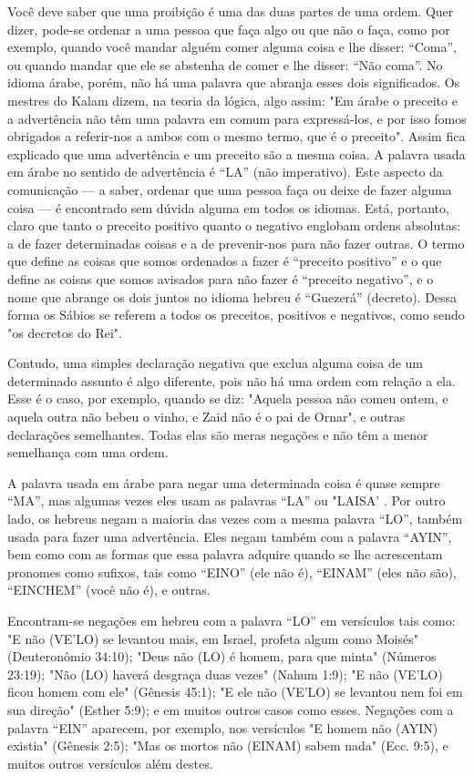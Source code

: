 Você deve saber que uma proibição é uma das duas partes de uma ordem.
Quer dizer, pode-se ordenar a uma pessoa que faça algo ou que não o
faça, como por exemplo, quando você mandar alguém comer alguma coisa e
lhe disser: ``Coma'', ou quando mandar que ele se abstenha de comer e lhe
disser: ``Não coma''. No idioma árabe, porém, não há uma palavra que
abranja esses dois significados. Os mestres do Kalam dizem, na teoria da
lógica, algo assim: "Em árabe o preceito e a advertência não têm uma
palavra em comum para expressá-los, e por isso fomos obrigados a
referir-nos a ambos com o mes­mo termo, que é o preceito". Assim fica
explicado que uma advertência e um preceito são a mesma coisa. A palavra
usada em árabe no sentido de advertên­cia é ``LA'' (não imperativo). Este
aspecto da comunicação --- a saber, ordenar que uma pessoa faça ou deixe
de fazer alguma coisa --- é encontrado sem dúvi­da alguma em todos os
idiomas. Está, portanto, claro que tanto o preceito posi­tivo quanto o
negativo englobam ordens absolutas: a de fazer determinadas coi­sas e a
de prevenir-nos para não fazer outras. O termo que define as coisas que
somos ordenados a fazer é ``preceito positivo'' e o que define as coisas
que so­mos avisados para não fazer é ``preceito negativo'', e o nome que
abrange os dois juntos no idioma hebreu é ``Guezerá'' (decreto). Dessa
forma os Sábios se referem a todos os preceitos, positivos e negativos,
como sendo "os decre­tos do Rei".

Contudo, uma simples declaração negativa que exclua alguma coisa de um
determinado assunto é algo diferente, pois não há uma ordem com rela­ção
a ela. Esse é o caso, por exemplo, quando se diz: "Aquela pessoa não
co­meu ontem, e aquela outra não bebeu o vinho, e Zaid não é o pai de
Ornar", e outras declarações semelhantes. Todas elas são meras negações
e não têm a menor semelhança com uma ordem.

A palavra usada em árabe para negar uma determinada coisa é quase sempre
``MA'', mas algumas vezes eles usam as palavras ``LA'' ou "LAISA' . Por
outro lado, os hebreus negam a maioria das vezes com a mesma palavra
``LO'', também usada para fazer uma advertência. Eles negam também com a
palavra ``AYIN'', bem como com as formas que essa palavra adquire quando
se lhe acres­centam pronomes como sufixos, tais como ``EINO'' (ele não é),
``EINAM'' (eles não são), ``EINCHEM'' (você não é), e outras.

Encontram-se negações em hebreu com a palavra ``LO'' em versícu­los tais
como: "E não (VE'LO) se levantou mais, em Israel, profeta algum como
Moisés" (Deuteronômio 34:10); "Deus não (LO) é homem, para que minta"
(Nú­meros 23:19); "Não (LO) haverá desgraça duas vezes" (Nahum 1:9); "E
não (VE'LO) ficou homem com ele" (Gênesis 45:1); "E ele não (VE'LO) se
levantou nem foi em sua direção" (Esther 5:9); e em muitos outros casos
como esses. Negações com a palavra ``EIN'' aparecem, por exemplo, nos
versículos "E homem 
não (AYIN) existia" (Gênesis 2:5); "Mas os mortos não (EINAM) sabem
nada" (Ecc. 9:5), e muitos outros versículos além destes.

